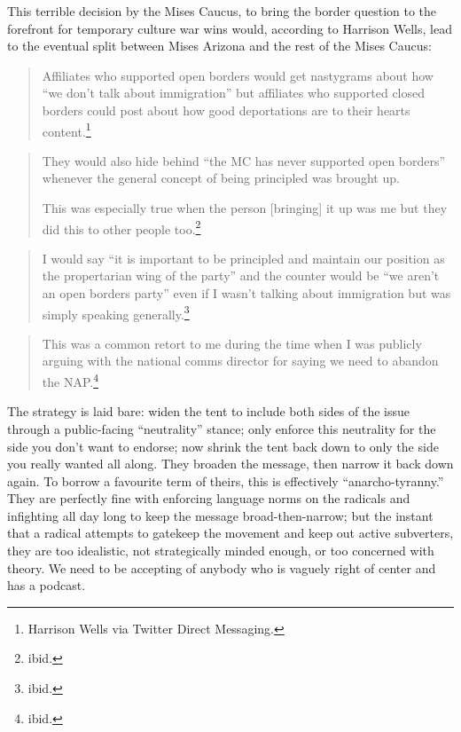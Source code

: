 \documentclass[11pt]{article}
\begin{document}
This terrible decision by the Mises Caucus, to bring the border question to the forefront for temporary culture war wins would, according to Harrison Wells, lead to the eventual split between Mises Arizona and the rest of the Mises Caucus:
\begin{quote}
Affiliates who supported open borders would get nastygrams about how ``we don't talk about immigration'' but affiliates who supported closed borders could post about how good deportations are to their hearts content.\footnote{Harrison Wells via Twitter Direct Messaging.}
\end{quote}

\begin{quote}
They would also hide behind ``the MC has never supported open borders'' whenever the general concept of being principled was brought up.

This was especially true when the person [bringing] it up was me but they did this to other people too.\footnote{ibid.}
\end{quote}

\begin{quote}
I would say ``it is important to be principled and maintain our position as the propertarian wing of the party'' and the counter would be ``we aren't an open borders party'' even if I wasn't talking about immigration but was simply speaking generally.\footnote{ibid.}
\end{quote}

\begin{quote}
This was a common retort to me during the time when I was publicly arguing with the national comms director for saying we need to abandon the NAP.\footnote{ibid.}
\end{quote}

The strategy is laid bare: widen the tent to include both sides of the issue through a public-facing ``neutrality'' stance; only enforce this neutrality for the side you don't want to endorse; now shrink the tent back down to only the side you really wanted all along. They broaden the message, then narrow it back down again. To borrow a favourite term of theirs, this is effectively ``anarcho-tyranny.'' They are perfectly fine with enforcing language norms on the radicals and infighting all day long to keep the message broad-then-narrow; but the instant that a radical attempts to gatekeep the movement and keep out active subverters, they are too idealistic, not strategically minded enough, or too concerned with theory. We need to be accepting of anybody who is vaguely right of center and has a podcast.
\end{document}
